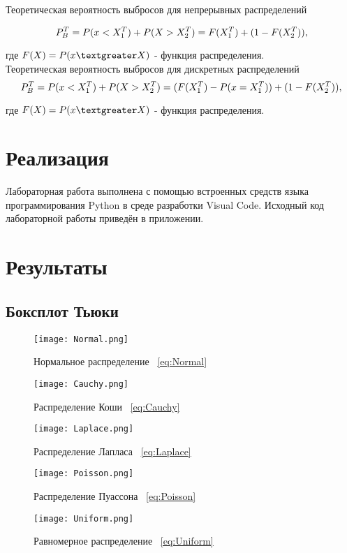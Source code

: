 \documentclass[12pt,a4paper]{scrartcl}
\begin{document}
Теоретическая вероятность выбросов для непрерывных распределений

\begin{equation}\label{eq:prob1}
\centering
P_B^T = P(x < X_1^T) + P(X > X_2^T) = F(X_1^T) + (1 - F(X_2^T)),
\end{equation}

где $F(X) = P(x\textgreater X) $ - функция распределения. \\

Теоретическая вероятность выбросов для дискретных распределений
\begin{equation}\label{eq:prob2}
\centering
P_B^T = P(x < X_1^T) + P(X > X_2^T) = (F(X_1^T) - P(x = X_1^T)) + (1 - F(X_2^T)),
\end{equation}

где $F(X) = P(x\textgreater X) $ - функция распределения.
\section {Реализация}
Лабораторная работа выполнена с помощью встроенных средств языка программирования Python в среде разработки Visual Code. Исходный код лабораторной работы приведён в приложении.
 
\section{Результаты}
\subsection{Боксплот Тьюки}
\begin{figure}[H]
  \centering
  \texttt{[image: Normal.png]}
  \caption{Нормальное распределение ~\eqref{eq:Normal}}
 
\end{figure}
\begin{figure}[H]
  \centering
  \texttt{[image: Cauchy.png]}
  \caption{Распределение Коши ~\eqref{eq:Cauchy}}
\end{figure}
\begin{figure}[H]
\centering
  \texttt{[image: Laplace.png]}
  \caption{Распределение Лапласа ~\eqref{eq:Laplace}}
\end{figure}
\begin{figure}[H]
  \centering
  \texttt{[image: Poisson.png]}
  \caption{Распределение Пуассона ~\eqref{eq:Poisson}}
\end{figure}
\begin{figure}[H]
  \centering
  \texttt{[image: Uniform.png]}
  \caption{Равномерное распределение ~\eqref{eq:Uniform}}
\end{figure}
\end{document}
